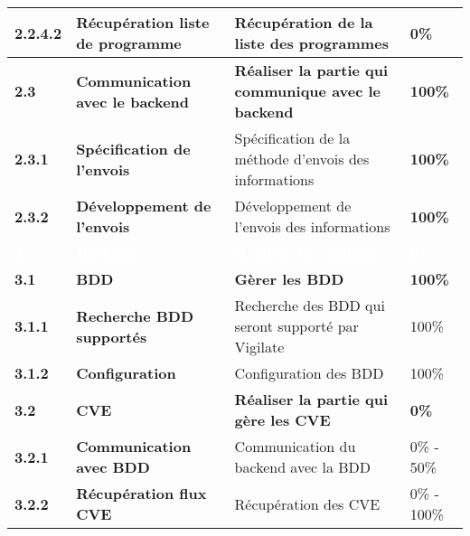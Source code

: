 \begin{supertabular}{|p{2.8cm} p{6cm}|p{5cm}|R{2cm}|}
  \hspace{12pt}
  \textbf{2.2.4.2}  & \textbf{Récupération liste de programme} & Récupération de la liste des programmes & 0\% \\
  \hline

  \textbf{2.3}  & \textbf{Communication avec le backend} & \textbf{Réaliser la partie qui communique avec le backend} & \textbf{100\%} \\
  \hline

  \hspace{6pt}
  \textbf{2.3.1}  & \textbf{Spécification de l'envois} & Spécification de la méthode d'envois des informations & \textbf{100\%} \\
  \hline

  \hspace{6pt}
  \textbf{2.3.2}  & \textbf{Développement de l'envois} & Développement de l'envois des informations & \textbf{100\%} \\
  \hline



  \textcolor{white}{\textbf{3}}  & \textcolor{white}{\textbf{Backend}} & \textcolor{white}{\textbf{Réaliser un backend}} & \textcolor{white}{\textbf{9\%}} \\
  \hline

  \textbf{3.1}  & \textbf{BDD} & \textbf{Gèrer les BDD} & \textbf{100\%} \\
  \hline

  \hspace{6pt}
  \textbf{3.1.1}  & \textbf{Recherche BDD supportés} & Recherche des BDD qui seront supporté par Vigilate & 100\% \\
  \hline

  \hspace{6pt}
  \textbf{3.1.2}  & \textbf{Configuration} & Configuration des BDD & 100\% \\
  \hline


  \textbf{3.2}  & \textbf{CVE} & \textbf{Réaliser la partie qui gère les CVE} & \textbf{0\%} \\
  \hline

  \hspace{6pt}
  \textbf{3.2.1}  & \textbf{Communication avec BDD} & Communication du backend avec la BDD  & 0\% - 50\% \\
  \hline

  \hspace{6pt}
  \textbf{3.2.2}  & \textbf{Récupération flux CVE} & Récupération des CVE & 0\% - 100\% \\
  \hline


\end{supertabular}
